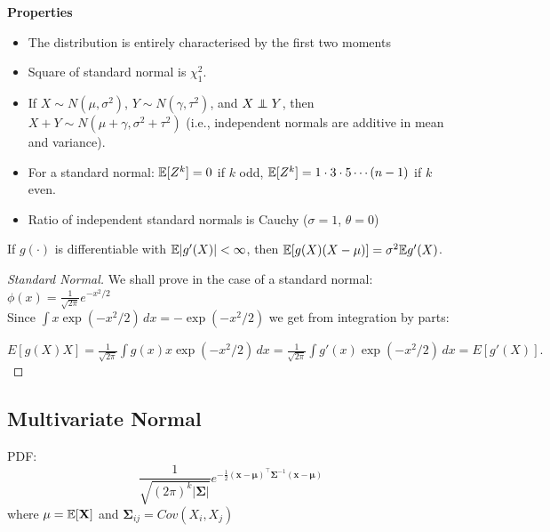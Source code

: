 \documentclass[DIV=14,titlepage=false]{scrreprt}
\begin{document}
\textbf{Properties}
\begin{itemize}
  \item The distribution is entirely characterised by the first two moments
  \item Square of standard normal is $ \chi^2_1 $.
  \item If $ X \sim N (\mu, \sigma^2) $, $ Y \sim N (\gamma, \tau^2) $, and $ X \perp\!\!\!\!\perp Y $, then $ X + Y \sim N (\mu + \gamma, \sigma^2 + \tau^2) $ (i.e., independent normals are additive in mean and variance).
  \item For a standard normal: $ \mathbb{E} [Z^k] = 0 $ if $ k $ odd, $ \mathbb{E} [Z^k] = 1 \cdot 3 \cdot 5 \dotsm (n-1) $ if $ k $ even.
  \item Ratio of independent standard normals is Cauchy ($ \sigma = 1 $, $ \theta = 0 $)
\end{itemize}

\begin{lemma}
  If $ g(\cdot) $ is differentiable with $ \mathbb{E} | g'(X)| < \infty $, then $ \mathbb{E} [g(X)(X - \mu)] = \sigma^2 \mathbb{E} g'(X) $.
\end{lemma}

\begin{proof}[Standard Normal]
  We shall prove in the case of a standard normal: $\phi(x) = \frac{1}{\sqrt{2\pi}} e^{-x^2/2}$
\\
  Since $\int x \exp(-x^2/2) \, dx = - \exp(-x^2/2)$ we get from integration by parts:
  
  $E[g(X)X] = \frac{1}{\sqrt{2\pi}} \int g(x) x \exp(-x^2/2) \, dx = \frac{1}{\sqrt{2\pi}} \int g'(x) \exp(-x^2/2) \, dx = E[g'(X)].$
\end{proof}

\subsection*{Multivariate Normal}
PDF: \[ \displaystyle \frac{1}{\sqrt{(2\pi)^k|\boldsymbol{\Sigma}|}} e^{-\frac{1}{2}(\mathbf{x}-\boldsymbol{\mu})^\top\boldsymbol{\Sigma}^{-1}(\mathbf{x}-\boldsymbol{\mu})} \]
where $ \mathbf{\mu} = \mathbb{E} [\mathbf{X}] $ and $ \mathbf{\Sigma}_{ij} = Cov (X_i, X_j) $
\vspace{10pt}
\end{document}
